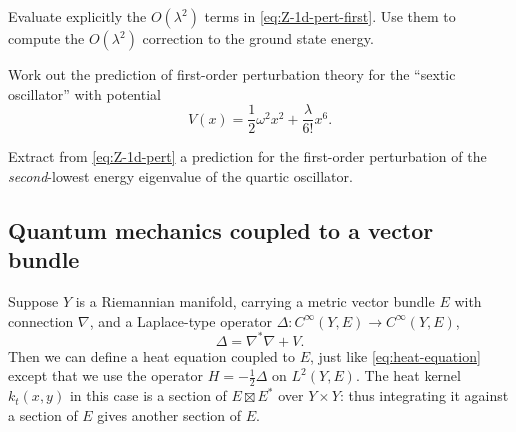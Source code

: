 \documentclass[12pt,letterpaper,reqno]{article}
\numberwithin{equation}{section}
\newcommand{\cC}{\ensuremath{\mathcal C}}
\newcommand{\half}{\ensuremath{\frac{1}{2}}}
\newcommand{\de}{\mathrm{d}}
\newcommand{\ti}[1]{\textit{#1}}
\newcommand{\fixme}[1]{{\color{orange}{[#1]}}}
\begin{document}
\begin{exercise} Evaluate explicitly the $O(\lambda^2)$
terms in \eqref{eq:Z-1d-pert-first}. Use them to compute
the $O(\lambda^2)$ correction to the ground state
energy.
\end{exercise}

\begin{exercise} Work out the prediction of first-order perturbation
theory for the ``sextic oscillator'' with potential
\begin{equation}
	V(x) = \half \omega^2 x^2 + \frac{\lambda}{6!} x^6.
\end{equation}
\end{exercise}


\begin{exercise} Extract from \eqref{eq:Z-1d-pert} a prediction
for the first-order perturbation of the \ti{second}-lowest
energy eigenvalue of the quartic oscillator.
\end{exercise}


\fixme{perturbation theory for heat kernel?}




\subsection{Quantum mechanics coupled to a vector bundle} \label{sec:1d-qft-with-bundle}

Suppose $Y$ is a Riemannian manifold, carrying a metric vector bundle $E$
with connection $\nabla$, 
and a Laplace-type operator $\Delta: C^\infty(Y,E) \to C^\infty(Y,E)$,
\begin{equation}
  \Delta = \nabla^* \nabla + V.
\end{equation}
Then we can define a heat equation coupled to $E$,
just like \eqref{eq:heat-equation} except that we use
the operator $H = -\half \Delta$
on $L^2(Y, E)$.
The heat kernel $k_t(x,y)$ in this case is a section of
$E \boxtimes E^*$ over $Y \times Y$: thus integrating it
against a section of $E$ gives another section of $E$.
\end{document}
